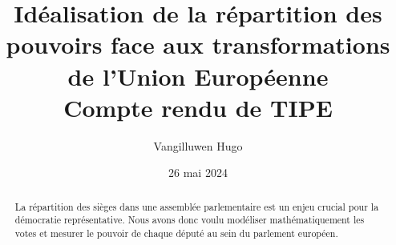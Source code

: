 \documentclass[french,12pt,a4paper]{article}
\title{Idéalisation de la répartition des pouvoirs face aux transformations de l’Union Européenne \\ Compte rendu de TIPE}
\author{Vangilluwen Hugo}
\date{26 mai 2024}
\theoremstyle{definition}
\theoremstyle{plain}
\theoremstyle{remark}
\begin{document}
	\maketitle
	
	\begin{abstract}
		La répartition des sièges dans une assemblée parlementaire est un enjeu crucial pour la démocratie représentative. Nous avons donc voulu modéliser mathématiquement les votes et mesurer le pouvoir de chaque député au sein du parlement européen.
	\end{abstract}
	
	\tableofcontents
	\pagebreak
	
	
	
	
	
	
	
	
	
	
	
	
	
	
	
\end{document}
